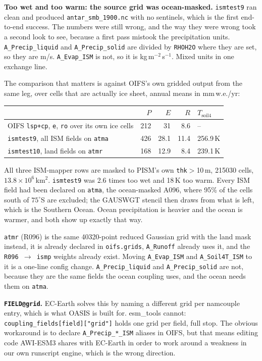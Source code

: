 \documentclass[11pt,a4paper]{article}
\newcommand{\code}[1]{\texttt{\small #1}}
\begin{document}
\medskip\noindent
\textbf{Too wet and too warm: the source grid was ocean-masked.} \code{ismtest9} ran clean and
produced \code{antar\_smb\_1900.nc} with no sentinels, which is the first end-to-end success. The
numbers were still wrong, and the way they were wrong took a second look to see, because a
first pass mistook the precipitation units. \code{A\_Precip\_liquid} and \code{A\_Precip\_solid}
are divided by \code{RHOH2O} where they are set, so they are m/s. \code{A\_Evap\_ISM} is not, so
it is kg\,m$^{-2}$\,s$^{-1}$. Mixed units in one exchange line.

The comparison that matters is against OIFS's own gridded output from the same leg, over cells
that are actually ice sheet, annual means in mm\,w.e./yr:

\begin{center}
\begin{tabular}{@{}lrrrl@{}}
\toprule
 & $P$ & $E$ & $R$ & $T_{\text{soil4}}$ \\
\midrule
OIFS \code{lsp+cp}, \code{e}, \code{ro} over its own ice cells & 212 & 31 & 8.6 & -- \\
\code{ismtest9}, all ISM fields on \code{atma}   & 426 & 28.1 & 11.4 & 256.9\,K \\
\code{ismtest10}, land fields on \code{atmr}     & 168 & 12.9 & 8.4 & 239.1\,K \\
\bottomrule
\end{tabular}
\end{center}

\noindent
All three ISM-mapper rows are masked to PISM's own \code{thk}$>$10\,m, 215030 cells,
$13.8\times10^6$\,km$^2$. \code{ismtest9} was 2.6 times too wet and 18\,K too warm. Every ISM
field had been declared on \code{atma}, the ocean-masked A096, where 95\% of the cells south of
$75^\circ$S are excluded; the GAUSWGT stencil then draws from what is left, which is the Southern
Ocean. Ocean precipitation is heavier and the ocean is warmer, and both show up exactly that way.

\code{atmr} (R096) is the same 40320-point reduced Gaussian grid with the land mask instead, it is
already declared in \code{oifs.grids}, \code{A\_Runoff} already uses it, and the
\code{R096 $\to$ ismp} weights already exist. Moving \code{A\_Evap\_ISM} and \code{A\_Soil4T\_ISM}
to it is a one-line config change. \code{A\_Precip\_liquid} and \code{A\_Precip\_solid} are not,
because they are the same fields the ocean coupling uses, and the ocean needs them on \code{atma}.

\medskip\noindent
\textbf{\code{FIELD@grid}.} EC-Earth solves this by naming a different grid per namcouple entry,
which is what OASIS is built for. esm\_tools cannot: \code{coupling\_fields[field]["grid"]} holds
one grid per field, full stop. The obvious workaround is to declare \code{A\_Precip\_*\_ISM}
aliases in OIFS, but that means editing code AWI-ESM3 shares with EC-Earth in order to work around
a weakness in our own runscript engine, which is the wrong direction.
\end{document}

